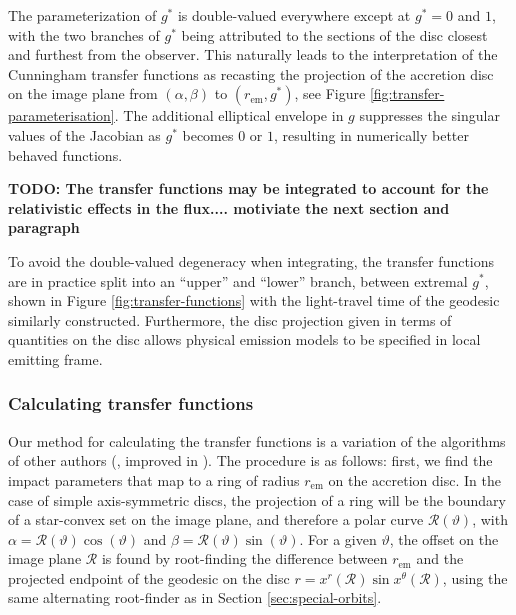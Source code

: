 \documentclass[fleqn,usenatbib]{mnras}
\newcommand{\todo}[1]{{\noindent \bf \color{red} TODO: #1}}
\begin{document}
The parameterization of $g^\ast$ is double-valued everywhere except at $g^\ast =
0$ and $1$, with the two branches of $g^\ast$ being attributed to the sections of the
disc closest and furthest from the observer. This naturally leads to the
interpretation of the Cunningham transfer functions as recasting the projection
of the accretion disc on the image plane from $(\alpha, \beta)$ to
$(r_\text{em}, g^\ast)$, see Figure \ref{fig:transfer-parameterisation}.  The
additional elliptical envelope in $g$ suppresses the singular values of the
Jacobian as $g^\ast$ becomes $0$ or $1$, resulting in numerically better behaved
functions.

\todo{The transfer functions may be integrated to account for the relativistic
    effects in the flux....
motiviate the next section and paragraph}

To
avoid the double-valued degeneracy when integrating, the transfer functions are
in practice split into an ``upper'' and ``lower'' branch, between extremal
$g^\ast$, shown in Figure \ref{fig:transfer-functions} with the light-travel
time of the geodesic similarly constructed. Furthermore, the disc projection
given in terms of quantities on the disc allows physical emission models to be
specified in local emitting frame.

\subsubsection{Calculating transfer functions}

Our method for calculating the transfer functions is a variation of the algorithms of other authors (\citealp{speith_photon_1995,bambi_testing_2017}, improved in \citealp{abdikamalov_public_2019}). The procedure is as follows: first, we find the impact parameters that map to a ring of radius $r_\text{em}$ on the accretion disc. In the case of simple axis-symmetric discs, the projection of a ring will be the boundary of a star-convex set on the image plane, and therefore a polar curve $\mathcal{R}(\vartheta)$, with $\alpha = \mathcal{R}(\vartheta) \cos(\vartheta)$ and $\beta = \mathcal{R}(\vartheta) \sin(\vartheta)$. For a given $\vartheta$, the offset on the image plane $\mathcal{R}$ is found by root-finding the difference between $r_\text{em}$ and the projected endpoint of the geodesic on the disc $r = x^r (\mathcal{R}) \sin x^\theta(\mathcal{R})$, using the same alternating root-finder as in Section \ref{sec:special-orbits}.
\end{document}
